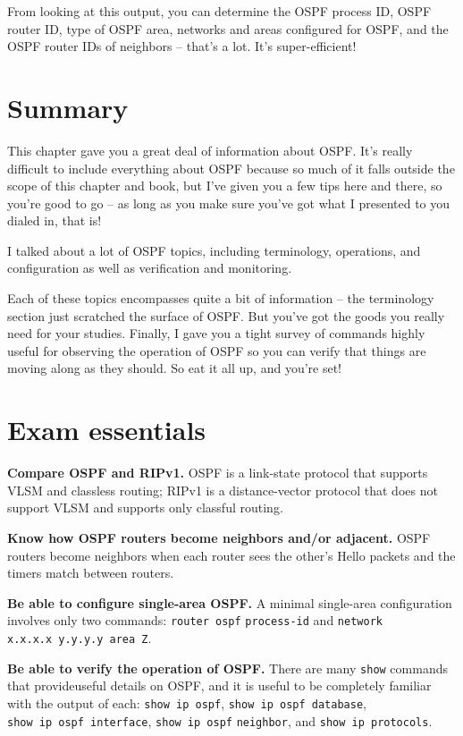 From looking at this output, you can determine the OSPF process ID, OSPF
router ID, type of OSPF area, networks and areas configured for OSPF,
and the OSPF router IDs of neighbors -- that's a lot. It's
super-efficient!



\section{Summary}

This chapter gave you a great deal of information about OSPF. It's
really difficult to include everything about OSPF because so much of it
falls outside the scope of this chapter and book, but I've given you a
few tips here and there, so you're good to go -- as long as you make sure
you've got what I presented to you dialed in, that is!

I talked about a lot of OSPF topics, including terminology, operations,
and configuration as well as verification and monitoring.

Each of these topics encompasses quite a bit of information -- the
terminology section just scratched the surface of OSPF. But you've got
the goods you really need for your studies. Finally, I gave you a tight
survey of commands highly useful for observing the operation of OSPF so
you can verify that things are moving along as they should. So eat it
all up, and you're set!



\section{Exam essentials}

\textbf{Compare OSPF and RIPv1.} OSPF is a link-state protocol that
supports VLSM and classless routing; RIPv1 is a distance-vector protocol
that does not support VLSM and supports only classful routing.

\textbf{Know how OSPF routers become neighbors and/or adjacent.} OSPF
routers become neighbors when each router sees the other's Hello packets
and the timers match between routers.

\protect\hypertarget{c18.xhtmlux5cux23Page_772}{}{}\textbf{Be able to
configure single-area OSPF.} A minimal single-area configuration
involves only two commands: \texttt{router\ ospf} \texttt{process-id}
and \texttt{network} \texttt{x.x.x.x\ y.y.y.y\ area\ Z}.

\textbf{Be able to verify the operation of OSPF.} There are many
\texttt{show} commands that provideuseful details on OSPF, and it is
useful to be completely familiar with the output of each:
\texttt{show\ ip\ ospf}, \texttt{show\ ip\ ospf\ database},
\texttt{show\ ip\ ospf\ interface}, \texttt{show\ ip\ ospf}
\texttt{neighbor}, and \texttt{show\ ip\ protocols}.



